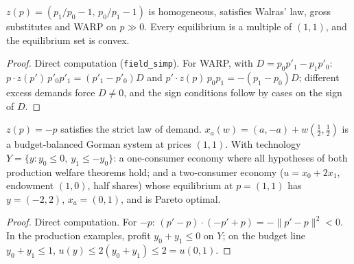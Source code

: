 \begin{theorem}
\label{thm:zcd_example}
\leanok
{}
$z(p) = (p_1/p_0 - 1,\, p_0/p_1 - 1)$ is homogeneous, satisfies Walras' law, gross substitutes and WARP on $p \gg 0$.
Every equilibrium is a multiple of $(1,1)$, and the equilibrium set is convex.
\end{theorem}
\begin{proof}
\leanok
Direct computation (\texttt{field\_simp}). For WARP, with $D = p_0p'_1 - p_1p'_0$:
$p\cdot z(p')\,p'_0p'_1 = (p'_1 - p'_0)D$ and $p'\cdot z(p)\,p_0p_1 = -(p_1 - p_0)D$; different excess demands force
$D \ne 0$, and the sign conditions follow by cases on the sign of $D$.
\end{proof}

\begin{theorem}
\label{thm:aggregation_examples}
\leanok
{}
$z(p) = -p$ satisfies the strict law of demand. $x_a(w) = (a, -a) + w(\tfrac12, \tfrac12)$ is a budget-balanced
Gorman system at prices $(1,1)$. With technology $Y = \{y : y_0 \le 0,\ y_1 \le -y_0\}$: a one-consumer economy where
all hypotheses of both production welfare theorems hold; and a two-consumer economy ($u = x_0 + 2x_1$, endowment
$(1,0)$, half shares) whose equilibrium at $p = (1,1)$ has $y = (-2, 2)$, $x_a = (0,1)$, and is Pareto optimal.
\end{theorem}
\begin{proof}
\leanok
Direct computation. For $-p$: $(p'-p)\cdot(-p' + p) = -\|p' - p\|^2 < 0$. In the production examples, profit
$y_0 + y_1 \le 0$ on $Y$; on the budget line $y_0 + y_1 \le 1$, $u(y) \le 2(y_0 + y_1) \le 2 = u(0,1)$.
\end{proof}

